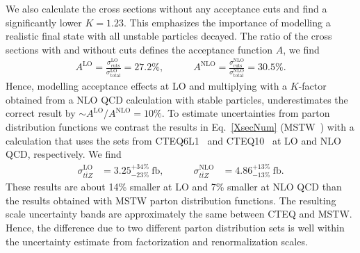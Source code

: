 \documentclass[preprint]{JHEP3}
\def\ttb{t\bar{t}}
\newcommand{\be}{\begin{eqnarray}}
\newcommand{\ee}{\end{eqnarray}}
\begin{document}
We also calculate the cross sections without any acceptance cuts and find 
a significantly lower  $K=1.23$. 
This emphasizes the importance of modelling a realistic final state with all unstable particles decayed.
The ratio of the cross sections with and without cuts defines the acceptance function $A$, we find
\be
  A^\mathrm{LO} = \frac{\sigma_{\mathrm{cuts}}^\mathrm{LO}}{\sigma_{\mathrm{total}}^\mathrm{LO}} = 27.2 \% ,
  \quad\quad\quad
  A^\mathrm{NLO} = \frac{\sigma_{\mathrm{cuts}}^\mathrm{NLO}}{\sigma_{\mathrm{total}}^\mathrm{NLO}} = 30.5 \%.
\ee
Hence, modelling acceptance effects at LO and multiplying with a $K$-factor obtained from a NLO QCD calculation with stable particles,
underestimates the correct result by $\sim A^\mathrm{LO}/A^\mathrm{NLO}=10\%$.
To estimate uncertainties from parton distribution functions we contrast the results in Eq.~\ref{XsecNum} (MSTW~\cite{Martin:2009iq})
with a calculation that uses the sets from CTEQ6L1~\cite{Pumplin:2002vw} and CTEQ10~\cite{Lai:2010vv} at LO and NLO QCD, respectively. 
We find 
\be
\label{XsecNumCTEQ}
  \sigma_{\ttb Z}^\mathrm{LO} &= 3.25^{+34\%}_{-23\%}~\mathrm{fb},
  \quad\quad\quad
  \sigma_{\ttb Z}^\mathrm{NLO} &= 4.86^{+13\%}_{-13\%}~\mathrm{fb}.
\ee
These results are about 14\% smaller at LO and 7\% smaller at NLO QCD than the results obtained with MSTW parton distribution functions. 
The resulting scale uncertainty bands are approximately the same between CTEQ and MSTW.
Hence, the difference due to two different parton distribution sets is well within the uncertainty estimate from factorization and renormalization scales.
\end{document}
